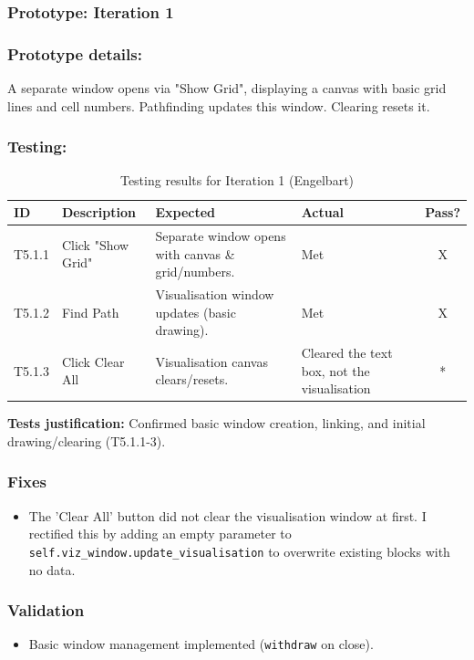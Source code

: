\newpage
\subsubsection*{Prototype: Iteration 1}




\subsubsection{Prototype details:}
 A separate window opens via "Show Grid", displaying a canvas with basic grid lines and cell numbers. Pathfinding updates this window. Clearing resets it.

\subsubsection{Testing:}
\begin{table}[htbp]
	\centering
	\begin{tabularx}{\textwidth}{|l|X|p{4.5cm}|p{1.5cm}|c|}
		\hline
		\textbf{ID} & \textbf{Description} & \textbf{Expected} & \textbf{Actual} & \textbf{Pass?} \\
		\hline
		T5.1.1 & Click "Show Grid" & Separate window opens with canvas \& grid/numbers. & Met & X \\
		\hline
		T5.1.2 & Find Path & Visualisation window updates (basic drawing). & Met & X \\
		\hline
		T5.1.3 & Click Clear All & Visualisation canvas clears/resets. & Cleared the text box, not the visualisation & * \\
		\hline
	\end{tabularx}
	\caption{Testing results for Iteration 1 (Engelbart)}
\end{table}
\textbf{Tests justification:} Confirmed basic window creation, linking, and initial drawing/clearing (T5.1.1-3).

\subsubsection{Fixes}
\begin{itemize}
	\item The 'Clear All' button did not clear the visualisation window at first. I rectified this by adding an empty parameter to \verb| self.viz_window.update_visualisation| to overwrite existing blocks with no data.
\end{itemize}

\subsubsection{Validation}
\begin{itemize}
	\item Basic window management implemented (\verb|withdraw| on close).
\end{itemize}

